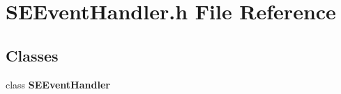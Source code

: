 \section{S\+E\+Event\+Handler.\+h File Reference}
\label{_s_e_event_handler_8h}
\subsection*{Classes}
\begin{DoxyCompactItemize}
\item 
class {\bf S\+E\+Event\+Handler}
\end{DoxyCompactItemize}
